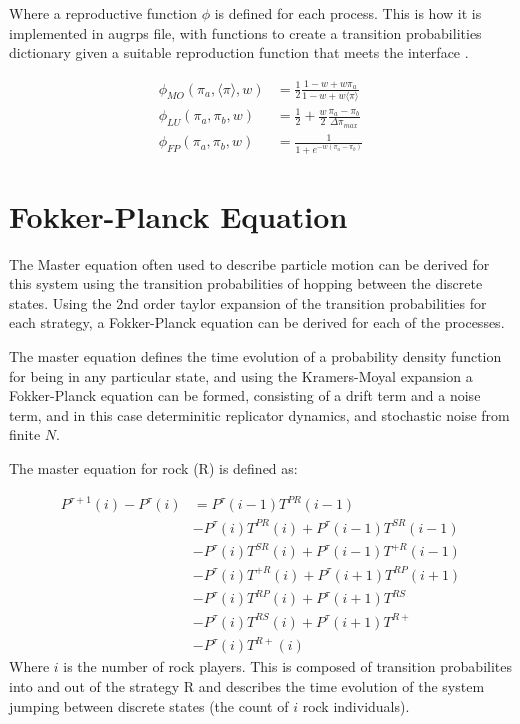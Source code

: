 \documentclass[%
 reprint,
 amsmath,amssymb,
 aps,
]{revtex4-2}
\begin{document}
Where a reproductive function $\phi$ is defined for each process.
This is how it is implemented in augrps file, with functions
to create a transition probabilities dictionary given a suitable reproduction 
function that meets the interface \cite{aug_rps}. 


\begin{align}
\phi_{MO}(\pi_a, \langle \pi \rangle, w) &= \frac{1}{2} \frac{1 - w + w \pi_a}{1 - w + w \langle \pi \rangle} \\
\phi_{LU}(\pi_a, \pi_b, w) &= \frac{1}{2} +  \frac{w}{2} \frac{\pi_a - \pi_b}{\Delta \pi_{max}} \\
\phi_{FP}(\pi_a, \pi_b, w) &= \frac{1}{1 + e^{-w(\pi_a - \pi_b)}}
\end{align}


\section{\label{sec:fokker-planck} Fokker-Planck Equation}

The Master equation \cite{alma9933506044604871} often used to 
describe particle motion can be derived for this 
system using the transition probabilities of hopping between the 
discrete states.
Using the 2nd order taylor expansion of the transition probabilities
for each strategy, a Fokker-Planck equation can be derived for each of the processes.


The master equation defines the time evolution of a probability density function
for being in any particular state, 
and using the Kramers-Moyal expansion a Fokker-Planck equation can be formed, 
consisting of a drift term and a noise term, and in this case
determinitic replicator dynamics, and stochastic noise from finite $N$.

The master equation \cite{alma9933506044604871} for rock (R) is defined as:

\begin{align}
P^{\tau + 1}(i) - P^\tau(i) &= P^\tau(i-1)T^{PR}(i-1) \nonumber\\
& - P^\tau(i)T^{PR}(i) + P^\tau(i-1)T^{SR}(i-1) \nonumber\\
& - P^\tau(i)T^{SR}(i) + P^\tau(i-1)T^{+R}(i-1) \nonumber\\
& - P^\tau(i)T^{+R}(i) + P^\tau(i+1)T^{RP}(i+1) \nonumber\\
&- P^\tau(i)T^{RP}(i) + P^\tau(i+1)T^{RS} \nonumber \\
&- P^\tau(i)T^{RS}(i) + P^\tau(i+1)T^{R+} \nonumber\\
&- P^\tau(i)T^{R+}(i)
\end{align}
Where $i$ is the number of rock players.
This is composed of transition probabilites into and out of the 
strategy R and describes the time evolution of the system 
jumping between discrete states (the count of $i$ rock individuals).
\end{document}
